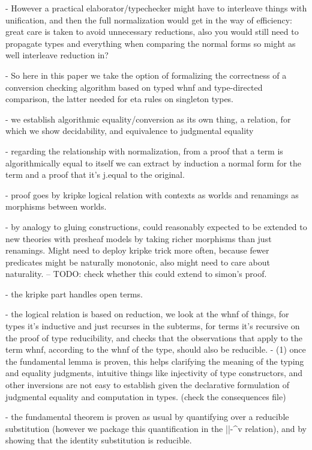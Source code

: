    - However a practical elaborator/typechecker might have to
   interleave things with unification, and then the full normalization
   would get in the way of efficiency: great care is taken to avoid
   unnecessary reductions, also you would still need to propagate
   types and everything when comparing the normal forms so might as
   well interleave reduction in?
   

 - So here in this paper we take the option of formalizing the
 correctness of a conversion checking algorithm based on typed whnf and
 type-directed comparison, the latter needed for eta rules on singleton types.

 - we establish algorithmic equality/conversion as its own thing, a
 relation, for which we show decidability, and equivalence to
 judgmental equality

 - regarding the relationship with normalization, from a proof that a
 term is algorithmically equal to itself we can extract by induction a
 normal form for the term and a proof that it's j.equal to the
 original.

 - proof goes by kripke logical relation with contexts as worlds and renamings as morphisms between worlds.
 
   - by analogy to gluing constructions, could reasonably expected to
   be extended to new theories with presheaf models by taking richer
   morphisms than just renamings.
   Might need to deploy kripke trick more often, because fewer
   predicates might be naturally monotonic, also might need to care
   about naturality.
   -- TODO: check whether this could extend to simon's proof.

 - the kripke part handles open terms.
   
 - the logical relation is based on reduction, we look at the whnf of
 things, for types it's inductive and just recurses in the subterms,
 for terms it's recursive on the proof of type reducibility, and checks that
 the observations that apply to the term whnf, according to the whnf of
 the type, should also be reducible.
   - (1) once the fundamental lemma is proven, this helps clarifying
     the meaning of the typing and equality
     judgments, intuitive things like injectivity of type constructors,
     and other inversions are not easy to establish given
     the declarative formulation of judgmental equality
     and computation in types. (check the consequences file)
 
   - the fundamental theorem is proven as usual by quantifying over a
   reducible substitution (however we package this quantification in
   the ||-^v relation), and by showing that the identity substitution
   is reducible.
 
